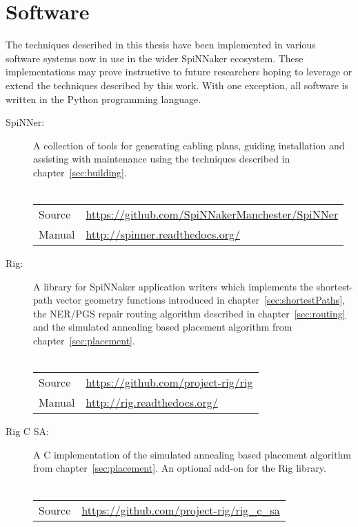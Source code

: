 \chapter{Software}
	\label{sec:software}
	
	The techniques described in this thesis have been implemented in various
	software systems now in use in the wider SpiNNaker ecosystem. These
	implementations may prove instructive to future researchers hoping to
	leverage or extend the techniques described by this work. With one exception,
	all software is written in the Python programming language.
	
	\begin{description}
		
		\item [SpiNNer:] A collection of tools for generating cabling plans, guiding
		installation and assisting with maintenance using the techniques described
		in chapter~\ref{sec:building}.
		\\
		\vspace*{-1.25em}
		\\
		\begin{tabular}{ll}
			Source & \url{https://github.com/SpiNNakerManchester/SpiNNer} \\
			Manual & \url{http://spinner.readthedocs.org/} \\
		\end{tabular}
		
		\item [Rig:] A library for SpiNNaker application writers which implements
		the shortest-path vector geometry functions introduced in
		chapter~\ref{sec:shortestPaths}, the NER/PGS repair routing algorithm
		described in chapter~\ref{sec:routing} and the simulated annealing based
		placement algorithm from chapter~\ref{sec:placement}.
		\\
		\vspace*{-1.25em}
		\\
		\begin{tabular}{ll}
			Source & \url{https://github.com/project-rig/rig} \\
			Manual & \url{http://rig.readthedocs.org/} \\
		\end{tabular}
		
		\item [Rig C SA:] A C implementation of the simulated annealing based
		placement algorithm from chapter~\ref{sec:placement}. An optional add-on
		for the Rig library.
		\\
		\vspace*{-1.25em}
		\\
		\begin{tabular}{ll}
			Source & \url{https://github.com/project-rig/rig_c_sa} \\
		\end{tabular}
		

\end{description}
